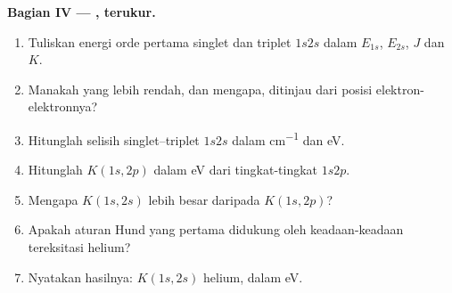 \begin{problem}
\medskip\noindent\textbf{Bagian IV --- , terukur.}
\begin{enumerate}[resume, beginpenalty=10000]
  \item Tuliskan energi orde pertama singlet dan triplet $1s2s$ dalam
        $E_{1s}$, $E_{2s}$, $J$ dan $K$.
  \item Manakah yang lebih rendah, dan mengapa, ditinjau dari posisi
        elektron-elektronnya?
  \item Hitunglah selisih singlet--triplet $1s2s$ dalam \unit{cm^{-1}} dan eV.
  \item Hitunglah $K(1s,2p)$ dalam eV dari tingkat-tingkat $1s2p$.
  \item Mengapa $K(1s,2s)$ lebih besar daripada $K(1s,2p)$?
  \item Apakah aturan Hund yang pertama didukung oleh keadaan-keadaan
        tereksitasi helium?
  \item Nyatakan hasilnya:  $K(1s,2s)$ helium, dalam eV.
\end{enumerate}
\end{problem}
